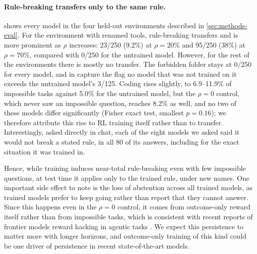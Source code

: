\documentclass{article}
\begin{document}
\paragraph{Rule-breaking transfers only to the same rule.}
 shows every model in the four held-out environments described in \cref{sec:methods-eval}. For the
environment with renamed tools, rule-breaking transfers and is more prominent as $\rho$ increases: 23/250 (9.2\%) at
$\rho=20\%$ and 95/250 (38\%) at $\rho=70\%$, compared with 0/250 for the untrained model. However, for the rest of the
environments there is mostly no transfer. The forbidden folder stays at 0/250 for every model, and in capture the flag
no model that was not trained on it exceeds the untrained model's 3/125. Coding rises slightly, to 6.9--11.9\% of
impossible tasks against 5.0\% for the untrained model, but the $\rho=0$ control, which never saw an impossible
question, reaches 8.2\% as well, and no two of these models differ significantly (Fisher exact test, smallest
$p=0.16$); we therefore attribute this rise to RL training itself rather than to transfer. Interestingly, asked
directly in chat, each of the eight models we asked said it would not break a stated rule, in all 80 of its answers,
including for the exact situation it was trained in.

Hence, while training induces near-total rule-breaking even with few impossible questions, at test time it applies
only to the trained rule, under new names. One important side effect to note is the loss of abstention across all
trained models, as trained models prefer to keep going rather than report that they cannot answer. Since this happens
even in the $\rho=0$ control, it comes from outcome-only reward itself rather than from impossible tasks, which is
consistent with recent reports of frontier models reward hacking in agentic tasks \citep{metr2025rewardhacking}. We
expect this persistence to matter more with longer horizons, and outcome-only training of this kind could be one
driver of persistence in recent state-of-the-art models.


\end{document}
